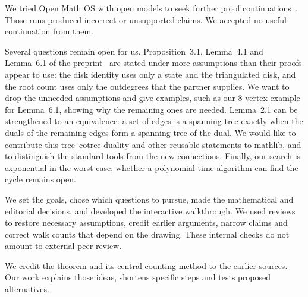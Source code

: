 \documentclass[11pt,a4paper]{article}
\begin{document}
We tried Open Math OS with open models to seek further proof continuations~\cite{MathOS}. Those runs produced incorrect or unsupported claims. We accepted no useful continuation from them.

Several questions remain open for us. Proposition~3.1, Lemma~4.1 and Lemma~6.1 of the preprint~\cite{OpenAI} are stated under more assumptions than their proofs appear to use: the disk identity uses only a state and the triangulated disk, and the root count uses only the outdegrees that the partner supplies. We want to drop the unneeded assumptions and give examples, such as our $8$-vertex example for Lemma~6.1, showing why the remaining ones are needed. Lemma~2.1 can be strengthened to an equivalence: a set of edges is a spanning tree exactly when the duals of the remaining edges form a spanning tree of the dual. We would like to contribute this tree--cotree duality and other reusable statements to mathlib, and to distinguish the standard tools from the new connections. Finally, our search is exponential in the worst case; whether a polynomial-time algorithm can find the cycle remains open.

We set the goals, chose which questions to pursue, made the mathematical and editorial decisions, and developed the interactive walkthrough. We used reviews to restore necessary assumptions, credit earlier arguments, narrow claims and correct walk counts that depend on the drawing. These internal checks do not amount to external peer review.

We credit the theorem and its central counting method to the earlier sources. Our work explains those ideas, shortens specific steps and tests proposed alternatives.
\end{document}
